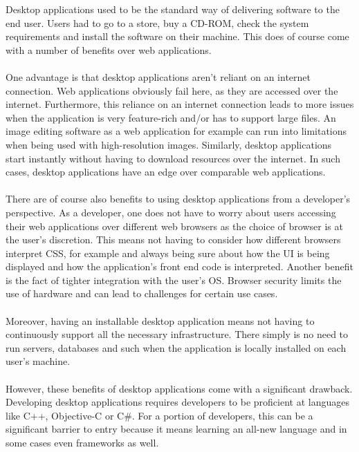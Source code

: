Desktop applications used to be the standard way of delivering software to the end user.
Users had to go to a store, buy a CD-ROM, check the system requirements and install the software 
on their machine.
This does of course come with a number of benefits over web applications.\paragraph{}
One advantage is that desktop applications aren't reliant on an internet connection.
Web applications obviously fail here, as they are accessed over the internet.
Furthermore, this reliance on an internet connection leads to more issues when the application
is very feature-rich and/or has to support large files.
An image editing software as a web application for example can run into limitations when being
used with high-resolution images. 
Similarly, desktop applications start instantly without having to download resources over the 
internet. 
In such cases, desktop applications have an edge over comparable web applications. \parencite{jensen2017}\paragraph{}
There are of course also benefits to using desktop applications from a developer's perspective.
As a developer, one does not have to worry about users accessing their web applications over different web browsers 
as the choice of browser is at the user's discretion. 
This means not having to consider how different browsers interpret CSS, for example and always being sure about how the UI 
is being displayed and how the application's front end code is interpreted.
Another benefit is the fact of tighter integration with the user's OS.
Browser security limits the use of hardware and can lead to challenges for certain use cases. \parencite{jensen2017}\paragraph{}
Moreover, having an installable desktop application means not having to continuously support all the necessary infrastructure.
There simply is no need to run servers, databases and such when the application is locally installed on each user's machine. \parencite{jensen2017}\paragraph{}
However, these benefits of desktop applications come with a significant drawback.
Developing desktop applications requires developers to be proficient at languages like C++, Objective-C or C\#. 
For a portion of developers, this can be a significant barrier to entry because it means learning an all-new language and in 
some cases even frameworks as well.